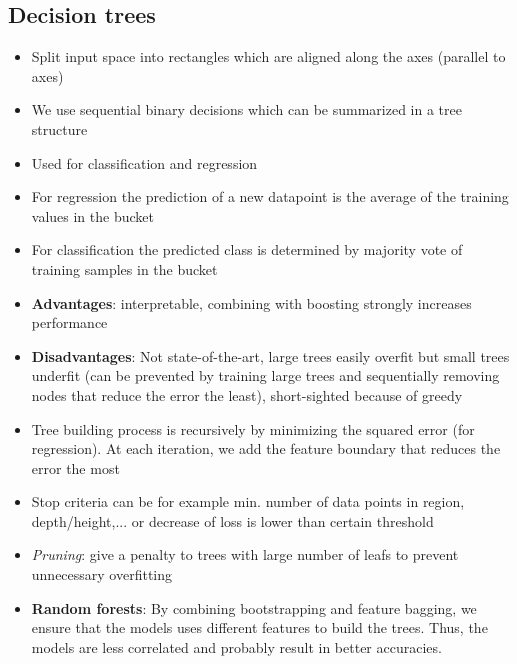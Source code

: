 \subsection{Decision trees}
\begin{itemize}
	\item Split input space into rectangles which are aligned along the axes (parallel to axes)
	\item We use sequential binary decisions which can be summarized in a tree structure
	\item Used for classification and regression
	\item For regression the prediction of a new datapoint is the average of the training values in the bucket
	\item For classification the predicted class is determined by majority vote of training samples in the bucket
	\item \textbf{Advantages}: interpretable, combining with boosting strongly increases performance
	\item \textbf{Disadvantages}: Not state-of-the-art, large trees easily overfit but small trees underfit (can be prevented by training large trees and sequentially removing nodes that reduce the error the least), short-sighted because of greedy
	\item Tree building process is recursively by minimizing the squared error (for regression). At each iteration, we add the feature boundary that reduces the error the most
	\item Stop criteria can be for example min. number of data points in region, depth/height,... or decrease of loss is lower than certain threshold
	\item \textit{Pruning}: give a penalty to trees with large number of leafs to prevent unnecessary overfitting 
	\item \textbf{Random forests}: By combining bootstrapping and feature bagging, we ensure that the models uses different features to build the trees. Thus, the models are less correlated and probably result in better accuracies.
\end{itemize}